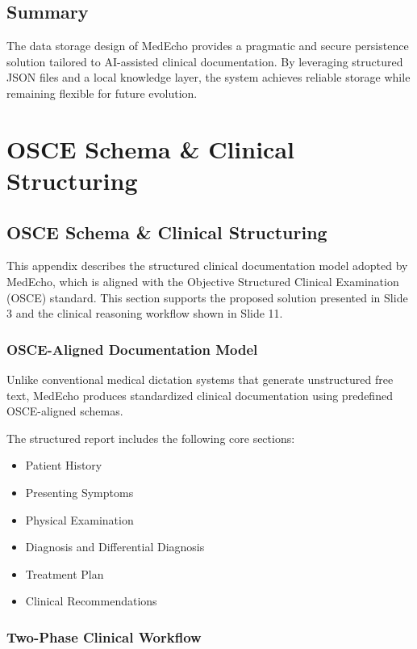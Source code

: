 \documentclass[12pt,a4paper]{report}
\begin{document}
\section{Summary}
The data storage design of MedEcho provides a pragmatic and secure persistence solution tailored to AI-assisted clinical documentation. By leveraging structured JSON files and a local knowledge layer, the system achieves reliable storage while remaining flexible for future evolution.

\clearpage
\chapter{OSCE Schema \& Clinical Structuring}\label{appendix:osce}
\section{OSCE Schema \& Clinical Structuring}

This appendix describes the structured clinical documentation model adopted by MedEcho, which is aligned with the Objective Structured Clinical Examination (OSCE) standard. This section supports the proposed solution presented in Slide 3 and the clinical reasoning workflow shown in Slide 11.

\subsection{OSCE-Aligned Documentation Model}

Unlike conventional medical dictation systems that generate unstructured free text, MedEcho produces standardized clinical documentation using predefined OSCE-aligned schemas.

The structured report includes the following core sections:

\begin{itemize}
    \item Patient History
    \item Presenting Symptoms
    \item Physical Examination
    \item Diagnosis and Differential Diagnosis
    \item Treatment Plan
    \item Clinical Recommendations
\end{itemize}

\subsection{Two-Phase Clinical Workflow}
\end{document}
